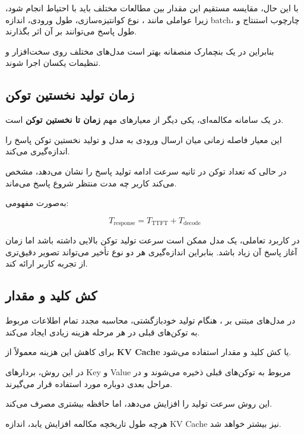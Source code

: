 با این حال، مقایسه مستقیم این مقدار بین مطالعات مختلف باید
با احتیاط انجام شود، زیرا عواملی مانند ، نوع کوانتیزه‌سازی،
طول ورودی، اندازه batch، چارچوب استنتاج و طول پاسخ می‌توانند
بر آن اثر بگذارند.

بنابراین در یک بنچمارک منصفانه بهتر است مدل‌های مختلف روی
سخت‌افزار و تنظیمات یکسان اجرا شوند.


\subsection{زمان تولید نخستین توکن}

در یک سامانه مکالمه‌ای، یکی دیگر از معیارهای مهم
\textbf{زمان تا نخستین توکن}
است.

این معیار فاصله زمانی میان ارسال ورودی به مدل و تولید نخستین
توکن پاسخ را اندازه‌گیری می‌کند.

در حالی که تعداد توکن در ثانیه سرعت ادامه تولید پاسخ را نشان
می‌دهد،  مشخص می‌کند کاربر چه مدت منتظر شروع پاسخ می‌ماند.

به‌صورت مفهومی:

\begin{equation}
T_{\mathrm{response}}
=
T_{\mathrm{TTFT}}
+
T_{\mathrm{decode}}
\end{equation}

در کاربرد تعاملی، یک مدل ممکن است سرعت تولید توکن بالایی داشته
باشد اما زمان آغاز پاسخ آن زیاد باشد.
بنابراین اندازه‌گیری هر دو نوع تأخیر می‌تواند تصویر دقیق‌تری
از تجربه کاربر ارائه کند.


\subsection{کش کلید و مقدار}

در مدل‌های مبتنی بر ، هنگام تولید خودبازگشتی،
محاسبه مجدد تمام اطلاعات مربوط به توکن‌های قبلی در هر مرحله
هزینه زیادی ایجاد می‌کند.

برای کاهش این هزینه معمولاً از
\textbf{KV Cache}
یا کش کلید و مقدار استفاده می‌شود.

در این روش، بردارهای Key و Value مربوط به توکن‌های قبلی
ذخیره می‌شوند و در مراحل بعدی دوباره مورد استفاده قرار
می‌گیرند.

این روش سرعت تولید را افزایش می‌دهد، اما حافظه بیشتری مصرف
می‌کند.

هرچه طول تاریخچه مکالمه افزایش یابد، اندازه KV Cache نیز
بیشتر خواهد شد.


